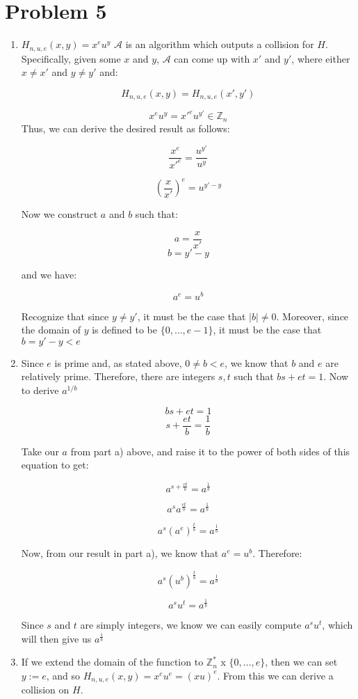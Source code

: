 \documentclass{article}
\begin{document}
\section*{Problem 5}
\begin{enumerate}
\item %
$H_{n, u, e} (x, y) = x^e u^y$
$\mathcal{A}$ is an algorithm which outputs a collision for $H$. Specifically, given some $x$ and $y$, $\mathcal{A}$ can come up with $x'$ and $y'$, where either $x \neq x'$ and $y \neq y'$ and:

$$H_{n, u, e} (x, y) = H_{n, u, e} (x', y')$$

$$x^e u^y = x'^{e} u^{y'} \in \mathbb{Z}_n$$
Thus, we can derive the desired result as follows:

$$\frac{x^e}{x'^{e}}= \frac{u^{y'}}{u^{y}}$$

$${(\frac{x}{x'})} ^ {e}= u^{y' - y}$$

Now we construct $a$ and $b$ such that:

$$a = \frac{x}{x'}$$
$$b = y' - y$$

and we have:

$$a^e = u^b$$

Recognize that since $y \neq y'$, it must be the case that $|b| \neq 0$. Moreover, since the domain of $y$ is defined to be $\{0, \dots , e-1\}$, it must be the case that $b = y' - y < e$

\item %
Since $e$ is prime and, as stated above, $0 \neq b < e$, we know that $b$ and $e$ are relatively prime. Therefore, there are integers $s, t$ such that $bs + et = 1$. Now to derive $a^{1/b}$

$$bs + et = 1$$
$$s + \frac{et}{b} = \frac{1}{b}$$

Take our $a$ from part a) above, and raise it to the power of both sides of this equation to get:

$$a^{s + \frac{et}{b}} = a^{\frac{1}{b}}$$

$$a^{s}  a^{\frac{et}{b}} = a^{\frac{1}{b}}$$

$$a^{s}  (a^{e})^{\frac{t}{b}} = a^{\frac{1}{b}}$$

Now, from our result in part a), we know that $a^e = u^b$. Therefore:

$$a^{s}  (u^{b})^{\frac{t}{b}} = a^{\frac{1}{b}}$$

$$a^{s}  u^{t} = a^{\frac{1}{b}}$$

Since $s$ and $t$ are simply integers, we know we can easily compute $a^{s}  u^{t}$, which will then give us $a^{\frac{1}{b}}$

\item %
If we extend the domain of the function to $\mathbb{Z}^{*}_n$ x $\{0, \dots , e\}$, then we can set $y := e$, and so $H_{n, u, e} (x, y) = x^e u^e = (xu)^e$. From this we can derive a collision on $H$.

\end{enumerate}
\end{document}
